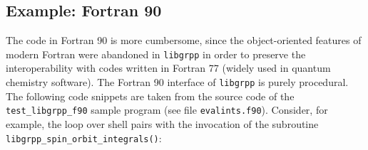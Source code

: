 \documentclass[12pt]{article}
\begin{document}
\subsection{Example: Fortran 90}

The code in Fortran 90 is more cumbersome, since the object-oriented features of modern Fortran were abandoned in \texttt{libgrpp} in order to preserve the interoperability with codes written in Fortran 77 (widely used in quantum chemistry software). The Fortran 90 interface of \texttt{libgrpp} is purely procedural. The following code snippets are taken from the source code of the \texttt{test\_libgrpp\_f90} sample program (see file \texttt{evalints.f90}). Consider, for example, the loop over shell pairs with the invocation of the subroutine \texttt{libgrpp\_spin\_orbit\_integrals()}:
\end{document}
